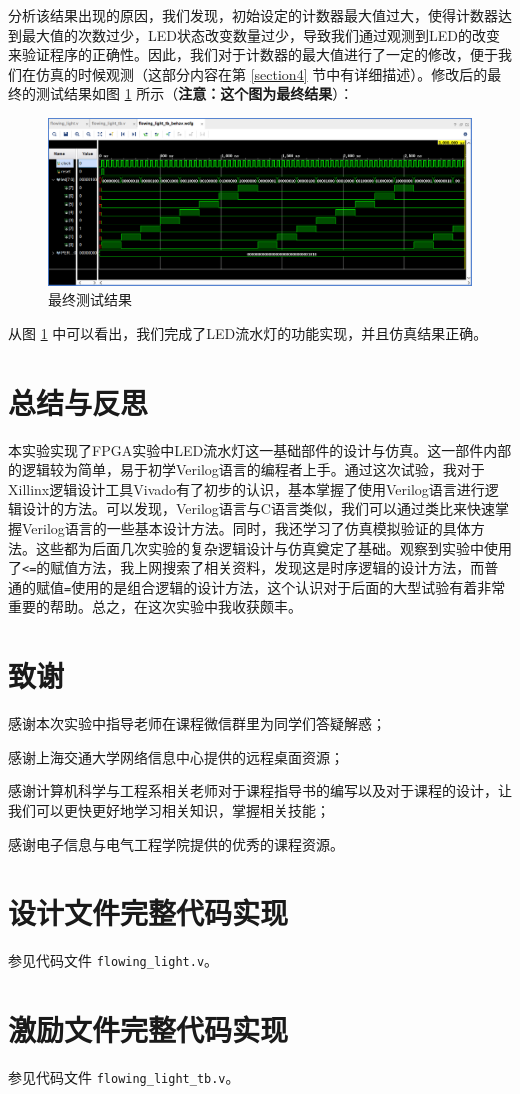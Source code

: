 \documentclass{cumcm}
\numberwithin{equation}{section}
\numberwithin{equation}{subsection}
\begin{document}
分析该结果出现的原因，我们发现，初始设定的计数器最大值过大，使得计数器达到最大值的次数过少，LED状态改变数量过少，导致我们通过观测到LED的改变来验证程序的正确性。因此，我们对于计数器的最大值进行了一定的修改，便于我们在仿真的时候观测（这部分内容在第 \ref{section4} 节中有详细描述）。修改后的最终的测试结果如图 \ref{fig2} 所示（\textbf{注意：这个图为最终结果}）：

\begin{figure}[htbp]
    \centering
    \includegraphics[width=6.3in]{2.png}
    \caption{最终测试结果}
    \label{fig2}
\end{figure}

从图 \ref{fig2} 中可以看出，我们完成了LED流水灯的功能实现，并且仿真结果正确。

\section{总结与反思}\label{section5}

本实验实现了FPGA实验中LED流水灯这一基础部件的设计与仿真。这一部件内部的逻辑较为简单，易于初学Verilog语言的编程者上手。通过这次试验，我对于Xillinx逻辑设计工具Vivado有了初步的认识，基本掌握了使用Verilog语言进行逻辑设计的方法。可以发现，Verilog语言与C语言类似，我们可以通过类比来快速掌握Verilog语言的一些基本设计方法。同时，我还学习了仿真模拟验证的具体方法。这些都为后面几次实验的复杂逻辑设计与仿真奠定了基础。观察到实验中使用了\texttt{<=}的赋值方法，我上网搜索了相关资料，发现这是时序逻辑的设计方法，而普通的赋值\texttt{=}使用的是组合逻辑的设计方法，这个认识对于后面的大型试验有着非常重要的帮助。总之，在这次实验中我收获颇丰。

\section{致谢}\label{section6}
感谢本次实验中指导老师在课程微信群里为同学们答疑解惑；

感谢上海交通大学网络信息中心提供的远程桌面资源；

感谢计算机科学与工程系相关老师对于课程指导书的编写以及对于课程的设计，让我们可以更快更好地学习相关知识，掌握相关技能；

感谢电子信息与电气工程学院提供的优秀的课程资源。
%
%

\clearpage
\begin{appendices}
\section{设计文件完整代码实现}\label{appsection1}
参见代码文件 \texttt{flowing\_light.v}。
\section{激励文件完整代码实现}\label{appsection2}
参见代码文件 \texttt{flowing\_light\_tb.v}。
\end{appendices}
\end{document}
